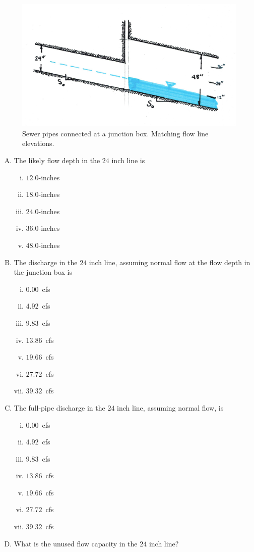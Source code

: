 \documentclass[11pt]{article}
\begin{document}
\begin{enumerate}
\begin{figure}[h!] %
\centering
   \includegraphics[width=4.5in]{SewerPipeMatchFlowline.jpg}
   \caption{Sewer pipes connected at a junction box.  Matching flow line elevations.}
   \label{fig:SewerPipeMatchFlowline} 
\end{figure}

\begin{enumerate}[(A)]
\item The likely flow depth in the $24$ inch line is
\begin{enumerate} [i)]
\item $12.0$-inches 
\item $18.0$-inches 
\item $24.0$-inches 
\item $36.0$-inches
\item $48.0$-inches
\end{enumerate} 
\item The discharge in the $24$ inch line, assuming normal flow at the flow depth in the junction box is 
\begin{enumerate} [i)]
\item $0.00$~cfs
\item $4.92$~cfs
\item $9.83$~cfs
\item $13.86$~cfs 
\item $19.66$~cfs
\item $27.72$~cfs
\item $39.32$~cfs
\end{enumerate} 
\item The full-pipe discharge in the $24$ inch line, assuming normal flow, is
\begin{enumerate} [i)]
\item $0.00$~cfs
\item $4.92$~cfs
\item $9.83$~cfs
\item $13.86$~cfs 
\item $19.66$~cfs
\item $27.72$~cfs
\item $39.32$~cfs
\end{enumerate} 
\item What is the unused flow capacity in the $24$ inch line? ~\\ ~\\
\end{enumerate}


\end{enumerate}
\end{document}
